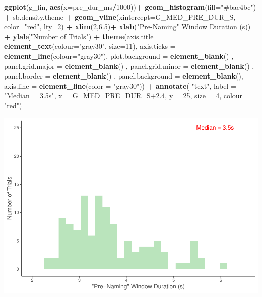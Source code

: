 \documentclass[
  doc,floatsintext]{apa6}
\newenvironment{Shaded}{\begin{snugshade}}{\end{snugshade}}
\newcommand{\AttributeTok}[1]{\textcolor[rgb]{0.13,0.29,0.53}{#1}}
\newcommand{\DecValTok}[1]{\textcolor[rgb]{0.00,0.00,0.81}{#1}}
\newcommand{\FloatTok}[1]{\textcolor[rgb]{0.00,0.00,0.81}{#1}}
\newcommand{\FunctionTok}[1]{\textcolor[rgb]{0.13,0.29,0.53}{\textbf{#1}}}
\newcommand{\NormalTok}[1]{#1}
\newcommand{\SpecialCharTok}[1]{\textcolor[rgb]{0.81,0.36,0.00}{\textbf{#1}}}
\newcommand{\StringTok}[1]{\textcolor[rgb]{0.31,0.60,0.02}{#1}}
\begin{document}
\begin{Shaded}
\begin{Highlighting}[]
\FunctionTok{ggplot}\NormalTok{(g\_fin, }\FunctionTok{aes}\NormalTok{(}\AttributeTok{x=}\NormalTok{pre\_dur\_ms}\SpecialCharTok{/}\DecValTok{1000}\NormalTok{))}\SpecialCharTok{+}
  \FunctionTok{geom\_histogram}\NormalTok{(}\AttributeTok{fill=}\StringTok{"\#bae4bc"}\NormalTok{) }\SpecialCharTok{+}
\NormalTok{  sb.density.theme }\SpecialCharTok{+}
  \FunctionTok{geom\_vline}\NormalTok{(}\AttributeTok{xintercept=}\NormalTok{G\_MED\_PRE\_DUR\_S, }\AttributeTok{color=}\StringTok{"red"}\NormalTok{, }\AttributeTok{lty=}\DecValTok{2}\NormalTok{) }\SpecialCharTok{+}
  \FunctionTok{xlim}\NormalTok{(}\DecValTok{2}\NormalTok{,}\FloatTok{6.5}\NormalTok{)}\SpecialCharTok{+}
  \FunctionTok{xlab}\NormalTok{(}\StringTok{\textquotesingle{}"Pre{-}Naming" Window Duration (s)\textquotesingle{}}\NormalTok{) }\SpecialCharTok{+}
  \FunctionTok{ylab}\NormalTok{(}\StringTok{"Number of Trials"}\NormalTok{) }\SpecialCharTok{+} 
  \FunctionTok{theme}\NormalTok{(}\AttributeTok{axis.title =} \FunctionTok{element\_text}\NormalTok{(}\AttributeTok{colour=}\StringTok{"gray30"}\NormalTok{, }\AttributeTok{size=}\DecValTok{11}\NormalTok{),}
        \AttributeTok{axis.ticks =} \FunctionTok{element\_line}\NormalTok{(}\AttributeTok{colour=}\StringTok{"gray30"}\NormalTok{),}
        \AttributeTok{plot.background =} \FunctionTok{element\_blank}\NormalTok{() ,}
        \AttributeTok{panel.grid.major =} \FunctionTok{element\_blank}\NormalTok{() ,}
        \AttributeTok{panel.grid.minor =} \FunctionTok{element\_blank}\NormalTok{() ,}
        \AttributeTok{panel.border =} \FunctionTok{element\_blank}\NormalTok{() ,}
        \AttributeTok{panel.background =} \FunctionTok{element\_blank}\NormalTok{(),}
        \AttributeTok{axis.line =} \FunctionTok{element\_line}\NormalTok{(}\AttributeTok{color =} \StringTok{"gray30"}\NormalTok{)) }\SpecialCharTok{+}
  \FunctionTok{annotate}\NormalTok{(}
    \StringTok{"text"}\NormalTok{, }\AttributeTok{label =} \StringTok{"Median = 3.5s"}\NormalTok{,}
    \AttributeTok{x =}\NormalTok{ G\_MED\_PRE\_DUR\_S}\FloatTok{+2.4}\NormalTok{, }\AttributeTok{y =} \DecValTok{25}\NormalTok{, }\AttributeTok{size =} \DecValTok{4}\NormalTok{, }\AttributeTok{colour =} \StringTok{"red"}\NormalTok{)}
\end{Highlighting}
\end{Shaded}

\includegraphics{revised_ms_analyses_files/figure-latex/r2-g-pre-duration-1.pdf}
\end{document}
